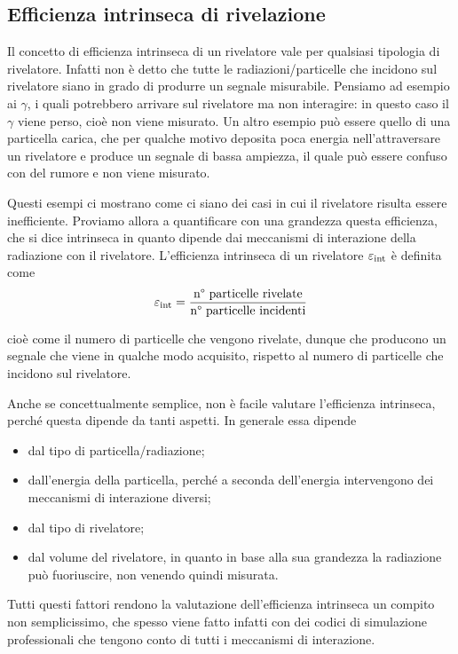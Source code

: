 \subsection{Efficienza intrinseca di rivelazione}
Il concetto di efficienza intrinseca di un rivelatore vale per qualsiasi tipologia di rivelatore. Infatti non è detto che tutte le radiazioni/particelle che incidono sul rivelatore siano in grado di produrre un segnale misurabile. Pensiamo ad esempio ai $\gamma$, i quali potrebbero arrivare sul rivelatore ma non interagire: in questo caso il $\gamma$ viene perso, cioè non viene misurato. Un altro esempio può essere quello di una particella carica, che per qualche motivo deposita poca energia nell'attraversare un rivelatore e produce un segnale di bassa ampiezza, il quale può essere confuso con del rumore e non viene misurato.

Questi esempi ci mostrano come ci siano dei casi in cui il rivelatore risulta essere inefficiente. Proviamo allora a quantificare con una grandezza questa efficienza, che si dice intrinseca in quanto dipende dai meccanismi di interazione della radiazione con il rivelatore. L'efficienza intrinseca di un rivelatore $\varepsilon_{\rm int}$ è definita come
\begin{equation*}
   \varepsilon_{\rm int}
   =\frac{\text{n° particelle rivelate}}{\text{n° particelle incidenti}}
\end{equation*}

cioè come il numero di particelle che vengono rivelate, dunque che producono un segnale che viene in qualche modo acquisito, rispetto al numero di particelle che incidono sul rivelatore.

Anche se concettualmente semplice, non è facile valutare l'efficienza intrinseca, perché questa dipende da tanti aspetti. In generale essa dipende
\begin{itemize}
   \item dal tipo di particella/radiazione;%
   \item dall'energia della particella, perché a seconda dell'energia intervengono dei meccanismi di interazione diversi;
   \item dal tipo di rivelatore;
   \item dal volume del rivelatore, in quanto in base alla sua grandezza la radiazione può fuoriuscire, non venendo quindi misurata.
\end{itemize}
Tutti questi fattori rendono la valutazione dell'efficienza intrinseca un compito non semplicissimo, che spesso viene fatto infatti con dei codici di simulazione professionali che tengono conto di tutti i meccanismi di interazione.
